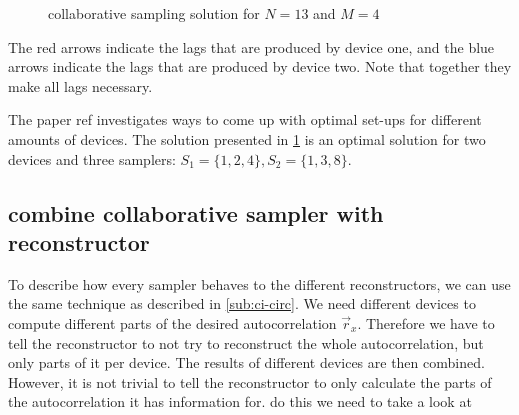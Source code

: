 \documentclass[a4paper, openany, oneside]{memoir}
\begin{document}
\begin{figure}[H]
\caption{collaborative sampling solution for $N=13$ and $M=4$}\label{tkz:collaborative_ruler}
\end{figure}

The red arrows indicate the lags that are produced by device one, and the blue arrows indicate the lags that are produced by device two. Note that together they make all lags necessary.

The paper ref  investigates ways to come up with optimal set-ups for different amounts of devices. The solution presented in \cref{tkz:collaborative_ruler} is an optimal solution for two devices and three samplers: $S_1=\{1,2,4\}, S_2 = \{1,3,8\}$.

\subsection{combine collaborative sampler with reconstructor}\label{sub:ci-collab}
To describe how every sampler behaves to the different reconstructors, we can use the same technique as described in \cref{sub:ci-circ}. We need different devices to compute different parts of the desired autocorrelation $\vec{r}_x$. Therefore we have to tell the reconstructor to not try to reconstruct the whole autocorrelation, but only parts of it per device. The results of different devices are then combined. However, it is not trivial to tell the reconstructor to only calculate the parts of the autocorrelation it has information for. do this we need to take a look at
\end{document}
